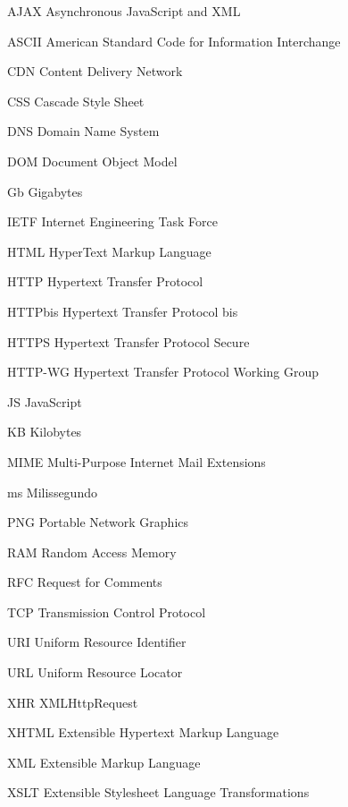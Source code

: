 %
%

\begin{siglas}
	\item[AJAX] Asynchronous JavaScript and XML
	\item[ASCII] American Standard Code for Information Interchange
	\item[CDN] Content Delivery Network
	\item[CSS] Cascade Style Sheet
	\item[DNS] Domain Name System
	\item[DOM] Document Object Model
	\item[Gb] Gigabytes
	\item[IETF] Internet Engineering Task Force
    \item[HTML] HyperText Markup Language
    \item[HTTP] Hypertext Transfer Protocol
    \item[HTTPbis] Hypertext Transfer Protocol bis
	\item[HTTPS] Hypertext Transfer Protocol Secure
    \item[HTTP-WG] Hypertext Transfer Protocol Working Group
    \item[JS] JavaScript
    \item[KB] Kilobytes
    \item[MIME] Multi-Purpose Internet Mail Extensions
    \item[ms] Milissegundo
    \item[PNG] Portable Network Graphics
    \item[RAM] Random Access Memory
    \item[RFC] Request for Comments
    \item[TCP] Transmission Control Protocol
    \item[URI] Uniform Resource Identifier
    \item[URL] Uniform Resource Locator
    \item[XHR] XMLHttpRequest
    \item[XHTML] Extensible Hypertext Markup Language
    \item[XML] Extensible Markup Language
    \item[XSLT] Extensible Stylesheet Language Transformations
\end{siglas}
